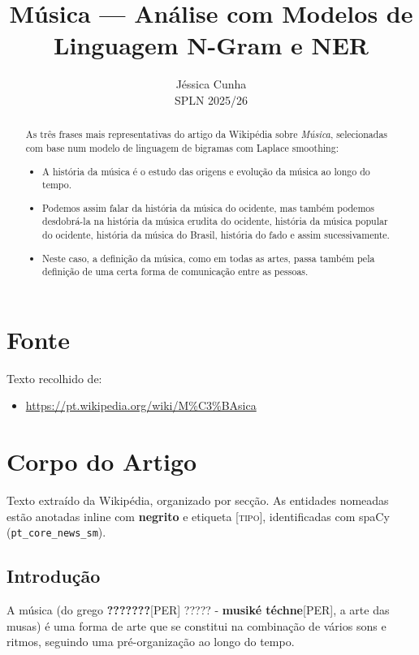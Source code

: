 \documentclass[a4paper,12pt]{article}
\title{Música --- Análise com Modelos de Linguagem N-Gram e NER}
\author{Jéssica Cunha \\ SPLN 2025/26}
\date{}
\begin{document}
\maketitle

\begin{abstract}
As três frases mais representativas do artigo da Wikipédia sobre
\textit{Música}, selecionadas com base num modelo de linguagem
de bigramas com Laplace smoothing:

\begin{itemize}
  \item A história da música é o estudo das origens e evolução da música ao longo do tempo.
  \item Podemos assim falar da história da música do ocidente, mas também podemos desdobrá-la na história da música erudita do ocidente, história da música popular do ocidente, história da música do Brasil, história do fado e assim sucessivamente.
  \item Neste caso, a definição da música, como em todas as artes, passa também pela definição de uma certa forma de comunicação entre as pessoas.
\end{itemize}
\end{abstract}

\section{Fonte}
Texto recolhido de:
\begin{itemize}
  \item \url{https://pt.wikipedia.org/wiki/M\%C3\%BAsica}
\end{itemize}

\section{Corpo do Artigo}
Texto extraído da Wikipédia, organizado por secção.
As entidades nomeadas estão anotadas inline com \textbf{negrito}
e etiqueta \textsc{[tipo]}, identificadas com spaCy (\texttt{pt\_core\_news\_sm}).

\subsection*{Introdução}
A música (do grego \textbf{???????}\textsc{[PER]} ????? - \textbf{musiké téchne}\textsc{[PER]}, a arte das musas) é uma forma de arte que se constitui na combinação de vários sons e ritmos, seguindo uma pré-organização ao longo do tempo.
\end{document}
